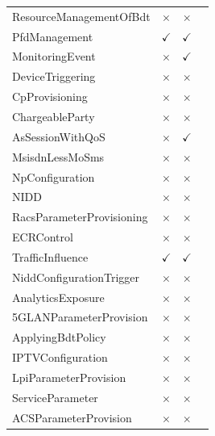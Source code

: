 \begin{longtable}{p{6cm} c c c}
\rowcolor{gray!15}
ResourceManagementOfBdt      & $\times$             & $\times$ \\
\rowcolor{white}
PfdManagement                & $\checkmark$         & $\checkmark$ \\
\rowcolor{gray!15}
MonitoringEvent              & $\times$             & $\checkmark$ \\
\rowcolor{white}
DeviceTriggering             & $\times$             & $\times$ \\
\rowcolor{gray!15}
CpProvisioning               & $\times$             & $\times$ \\
\rowcolor{white}
ChargeableParty              & $\times$             & $\times$ \\
\rowcolor{gray!15}
AsSessionWithQoS             & $\times$             & $\checkmark$ \\
\rowcolor{white}
MsisdnLessMoSms              & $\times$             & $\times$ \\
\rowcolor{gray!15}
NpConfiguration              & $\times$             & $\times$ \\
\rowcolor{white}
NIDD                         & $\times$             & $\times$ \\
\rowcolor{gray!15}
RacsParameterProvisioning    & $\times$             & $\times$ \\
\rowcolor{white}
ECRControl                   & $\times$             & $\times$ \\
\rowcolor{gray!15}
TrafficInfluence             & $\checkmark$         & $\checkmark$ \\
\rowcolor{white}
NiddConfigurationTrigger     & $\times$             & $\times$ \\
\rowcolor{gray!15}
AnalyticsExposure            & $\times$             & $\times$ \\
\rowcolor{white}
5GLANParameterProvision      & $\times$             & $\times$ \\
\rowcolor{gray!15}
ApplyingBdtPolicy            & $\times$             & $\times$ \\
\rowcolor{white}
IPTVConfiguration            & $\times$             & $\times$ \\
\rowcolor{gray!15}
LpiParameterProvision        & $\times$             & $\times$ \\
\rowcolor{white}
ServiceParameter             & $\times$             & $\times$ \\
\rowcolor{gray!15}
ACSParameterProvision        & $\times$             & $\times$ \\

\end{longtable}

